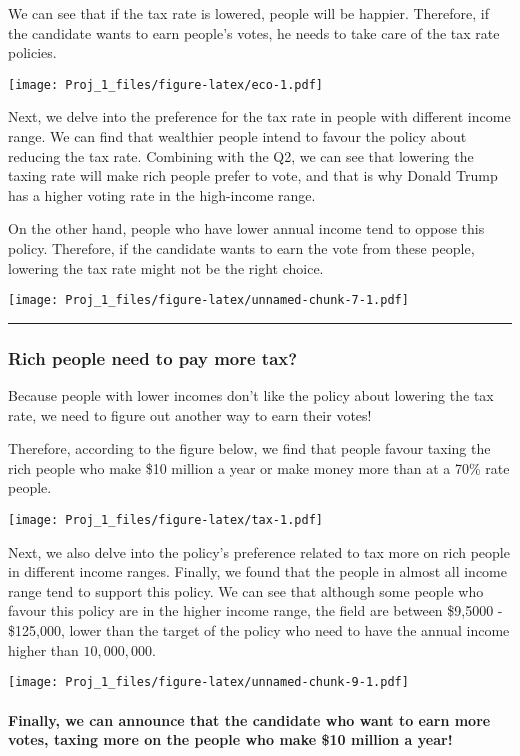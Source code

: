 \documentclass[
]{article}
\begin{document}
We can see that if the tax rate is lowered, people will be happier.
Therefore, if the candidate wants to earn people's votes, he needs to
take care of the tax rate policies.

\texttt{[image: Proj\_1\_files/figure-latex/eco-1.pdf]}

Next, we delve into the preference for the tax rate in people with
different income range. We can find that wealthier people intend to
favour the policy about reducing the tax rate. Combining with the Q2, we
can see that lowering the taxing rate will make rich people prefer to
vote, and that is why Donald Trump has a higher voting rate in the
high-income range.

On the other hand, people who have lower annual income tend to oppose
this policy. Therefore, if the candidate wants to earn the vote from
these people, lowering the tax rate might not be the right choice.

\texttt{[image: Proj\_1\_files/figure-latex/unnamed-chunk-7-1.pdf]}

\begin{center}\rule{0.5\linewidth}{0.5pt}\end{center}

\hypertarget{rich-people-need-to-pay-more-tax}{%
\subsubsection{Rich people need to pay more
tax?}\label{rich-people-need-to-pay-more-tax}}

Because people with lower incomes don't like the policy about lowering
the tax rate, we need to figure out another way to earn their votes!

Therefore, according to the figure below, we find that people favour
taxing the rich people who make \$10 million a year or make money more
than at a 70\% rate people.

\texttt{[image: Proj\_1\_files/figure-latex/tax-1.pdf]}

Next, we also delve into the policy's preference related to tax more on
rich people in different income ranges. Finally, we found that the
people in almost all income range tend to support this policy. We can
see that although some people who favour this policy are in the higher
income range, the field are between \$9,5000 - \$125,000, lower than the
target of the policy who need to have the annual income higher than
\textbf{\(10,000,000\)}.

\texttt{[image: Proj\_1\_files/figure-latex/unnamed-chunk-9-1.pdf]}

\hypertarget{finally-we-can-announce-that-the-candidate-who-want-to-earn-more-votes-taxing-more-on-the-people-who-make-10-million-a-year}{%
\paragraph{Finally, we can announce that the candidate who want to earn
more votes, taxing more on the people who make \$10 million a
year!}\label{finally-we-can-announce-that-the-candidate-who-want-to-earn-more-votes-taxing-more-on-the-people-who-make-10-million-a-year}}
\end{document}
